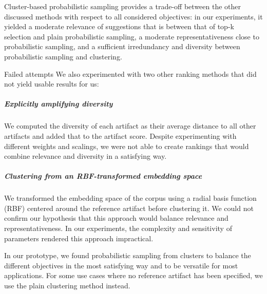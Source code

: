Cluster-based probabilistic sampling provides a trade-off between the other discussed methods with respect to all considered objectives:
in our experiments, it yielded a moderate relevance of suggestions that is between that of top-k selection and plain probabilistic sampling, a moderate representativeness close to probabilistic sampling, and a sufficient irredundancy and diversity between probabilistic sampling and clustering.

\begin{genericbox}{Failed attempts}
	We also experimented with two other ranking methods that did not yield usable results for us:

	\subparagraph{Explicitly amplifying diversity}
	We computed the diversity of each artifact as their average distance to all other artifacts and added that to the artifact score.
	Despite experimenting with different weights and scalings, we were not able to create rankings that would combine relevance and diversity in a satisfying way.

	\subparagraph{Clustering from an RBF-transformed embedding space}
	We transformed the embedding space of the corpus using a radial basis function (RBF) centered around the reference artifact before clustering it.
	We could not confirm our hypothesis that this approach would balance relevance and representativeness.
	In our experiments, the complexity and sensitivity of parameters rendered this approach impractical.
\end{genericbox}


In our prototype, we found probabilistic sampling from clusters to balance the different objectives in the most satisfying way and to be versatile for most applications.
For some use cases where no reference artifact has been specified, we use the plain clustering method instead.
